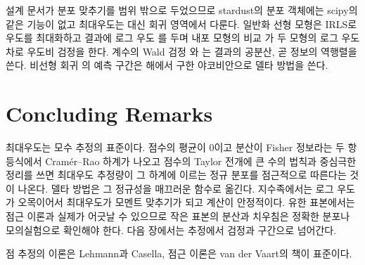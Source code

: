 \begin{instardust}
설계 문서가 분포 맞추기를 범위 밖으로 두었으므로 stardust의 분포 객체에는 scipy의  같은 기능이 없고 최대우도는 대신 회귀 영역에서 다룬다. 일반화 선형 모형은 IRLS로 우도를 최대화하고 결과에 로그 우도 를 두며 내포 모형의 비교 가 두 모형의 로그 우도 차로 우도비 검정을 한다. 계수의 Wald 검정 와 는 결과의 공분산, 곧 정보의 역행렬을 쓴다. 비선형 회귀 의 예측 구간은 해에서 구한 야코비안으로 델타 방법을 쓴다.
\end{instardust}

\section{Concluding Remarks}

최대우도는 모수 추정의 표준이다. 점수의 평균이 $0$이고 분산이 Fisher 정보라는 두 항등식에서 Cramér--Rao 하계가 나오고 점수의 Taylor 전개에 큰 수의 법칙과 중심극한정리를 쓰면 최대우도 추정량이 그 하계에 이르는 정규 분포를 점근적으로 따른다는 것이 나온다. 델타 방법은 그 정규성을 매끄러운 함수로 옮긴다. 지수족에서는 로그 우도가 오목이어서 최대우도가 모멘트 맞추기가 되고 계산이 안정적이다. 유한 표본에서는 점근 이론과 실제가 어긋날 수 있으므로 작은 표본의 분산과 치우침은 정확한 분포나 모의실험으로 확인해야 한다. 다음 장에서는 추정에서 검정과 구간으로 넘어간다.

점 추정의 이론은 Lehmann과 Casella\cite{lehmann1998}, 점근 이론은 van der Vaart\cite{vandervaart1998}의 책이 표준이다.

\chapterreferences
